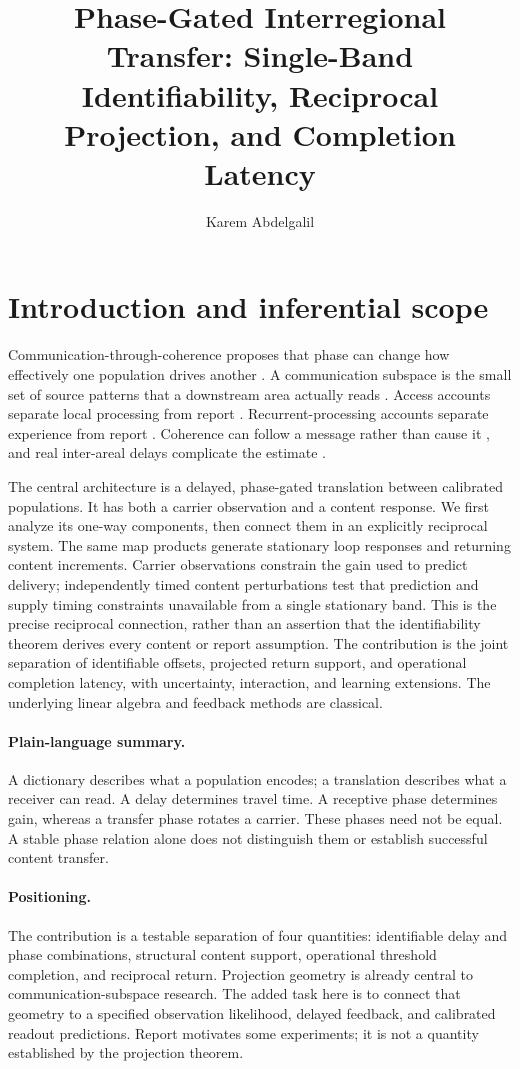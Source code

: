 \documentclass[submission,nolinenumbers]{esj}
\title{Phase-Gated Interregional Transfer: Single-Band Identifiability, Reciprocal Projection, and Completion Latency}
\author[1,*]{Karem Abdelgalil}\affil[1]{Independent Researcher, Cairo, Egypt}
\begin{document}
\maketitle

\section{Introduction and inferential scope}\label{sec:intro}
Communication-through-coherence proposes that phase can change how effectively one population drives another \citep{fries2015,bastos2015}. A communication subspace is the small set of source patterns that a downstream area actually reads \citep{semedo2019}. Access accounts separate local processing from report \citep{dehaene2006}. Recurrent-processing accounts separate experience from report \citep{lamme2006}. Coherence can follow a message rather than cause it \citep{schneider2021}, and real inter-areal delays complicate the estimate \citep{dowdall2023}.

The central architecture is a delayed, phase-gated translation between calibrated populations. It has both a carrier observation and a content response. We first analyze its one-way components, then connect them in an explicitly reciprocal system. The same map products generate stationary loop responses and returning content increments. Carrier observations constrain the gain used to predict delivery; independently timed content perturbations test that prediction and supply timing constraints unavailable from a single stationary band. This is the precise reciprocal connection, rather than an assertion that the identifiability theorem derives every content or report assumption. The contribution is the joint separation of identifiable offsets, projected return support, and operational completion latency, with uncertainty, interaction, and learning extensions. The underlying linear algebra and feedback methods are classical.

\paragraph{Plain-language summary.} A dictionary describes what a population encodes; a translation describes what a receiver can read. A delay determines travel time. A receptive phase determines gain, whereas a transfer phase rotates a carrier. These phases need not be equal. A stable phase relation alone does not distinguish them or establish successful content transfer.

\paragraph{Positioning.} The contribution is a testable separation of four quantities: identifiable delay and phase combinations, structural content support, operational threshold completion, and reciprocal return. Projection geometry is already central to communication-subspace research. The added task here is to connect that geometry to a specified observation likelihood, delayed feedback, and calibrated readout predictions. Report motivates some experiments; it is not a quantity established by the projection theorem.
\end{document}
